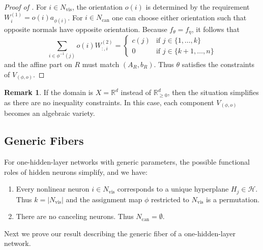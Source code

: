 \documentclass{article}
\theoremstyle{definition}
\newtheorem{remark}[theorem]{Remark}
\newcommand{\R}{\mathbb{R}}
\newcommand{\weights}[1]{W^{(#1)}}
\begin{document}
\begin{proof}[Proof of ]
For $i \in N_{\text{vis}}$, the orientation $o(i)$   
is determined by the %
requirement $\weights{1}_i = o(i)a_{\phi(i)}$.  
For $i \in N_{\text{can}}$ one can choose either orientation such that opposite normals have opposite orientation. 
%
Because $f_\theta = f_\eta$, it follows that      $$\sum_{i \in \phi^{-1}(j)} o(i) \weights{2}_{:,i} = 
        \begin{cases} 
        c(j) & \text{if } j \in \{1, \dots, k\} \\
        0 & \text{if } %
        j\in\{k+1,\ldots, n\} 
        \end{cases}$$ 
        and the affine part on $R$ must match $(A_R, b_R)$. Thus $\theta$ satisfies the constraints of $V_{(\phi, o)}$. 
\end{proof}
\begin{remark}
    If the domain is $X = \R^d$ instead of $\mathbb{R}_{\geq0}^d$, then the situation simplifies as there are no inequality constraints. In this case, each component $V_{(\phi, o)}$ becomes an algebraic variety. 
\end{remark}


\subsection{Generic Fibers}  

For one-hidden-layer networks with generic parameters, the possible functional roles of hidden neurons simplify, and we have: 
\begin{enumerate}
    \item Every nonlinear neuron $i \in N_{\text{vis}}$ corresponds to a unique hyperplane $H_j \in \mathcal{H}$. Thus $k = |N_{\text{vis}}|$ and the assignment map $\phi$ restricted to $N_{\text{vis}}$ is a permutation.
    \item There are no canceling neurons. Thus $N_{\text{can}} = \emptyset$. 
\end{enumerate}


Next we prove our result describing the generic fiber of a one-hidden-layer network. 


\propgenericlayerwisefiber* 
\end{document}
